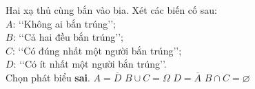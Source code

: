 \begin{ex}%
	Hai  xạ thủ cùng bắn vào bia. Xét các biến cố sau:\\
	$A$: \lq\lq Không ai  bắn trúng\rq\rq;\\
	$B$: \lq\lq Cả  hai đều bắn trúng\rq\rq;\\
	$C$: \lq\lq Có đúng nhất một người bắn trúng\rq\rq;\\ 
	$D$: \lq\lq Có ít nhất một người bắn  trúng\rq\rq.\\
	Chọn  phát biểu {\bf sai}.
	\choice 
		 {$A=\overline{D}$}
		 {\True $B\cup C=\Omega$}
		{$D=\overline{A}$} 
		 {$B\cap C=\varnothing$}
\end{ex}

